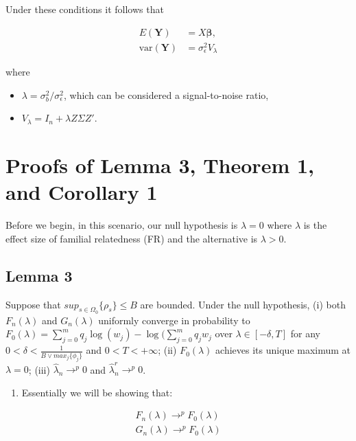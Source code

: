 \documentclass[
]{article}
\providecommand{\tightlist}{%
  \setlength{\itemsep}{0pt}\setlength{\parskip}{0pt}}
\begin{document}
Under these conditions it follows that

\[
\begin{aligned}
E(\mathbf{Y}) &= X\mathbf{\beta},\\
\text{var}(\mathbf{Y}) &= \sigma_{\epsilon}^2 V_{\lambda}
\end{aligned}
\]

where

\begin{itemize}
\tightlist
\item
  \(\lambda = \sigma_b^2 / \sigma_{\epsilon}^2\), which can be
  considered a signal-to-noise ratio,
\item
  \(V_{\lambda} = I_n + \lambda Z\Sigma Z'\).
\end{itemize}

\section{Proofs of Lemma 3, Theorem 1, and Corollary
1}\label{proofs-of-lemma-3-theorem-1-and-corollary-1}

Before we begin, in this scenario, our null hypothesis is
\(\lambda = 0\) where \(\lambda\) is the effect size of familial
relatedness (FR) and the alternative is \(\lambda > 0\).

\subsection{Lemma 3}\label{lemma-3}

Suppose that \(sup_{s \in \Omega_0}\{\rho_s\} \le B\) are bounded. Under
the null hypothesis, (i) both \(F_n(\lambda)\) and \(G_n(\lambda)\)
uniformly converge in probability to
\(F_0(\lambda) = \sum_{j=0}^m q_j \log(w_j) - \log(\sum_{j=0}^m q_j w_j\)
over \(\lambda \in [-\delta, T]\) for any
\(0 < \delta < \frac{1}{B \vee max_j\{ \phi_j\}}\) and
\(0 < T < +\infty\); (ii) \(F_0(\lambda)\) achieves its unique maximum
at \(\lambda = 0\); (iii) \(\hat \lambda_n \rightarrow^p 0\) and
\(\hat \lambda^r_n \rightarrow^p 0\).

\begin{enumerate}
\def\labelenumi{\roman{enumi})}
\tightlist
\item
  Essentially we will be showing that:
\end{enumerate}

\[
\begin{split}
F_n(\lambda) \rightarrow^p F_0(\lambda) \\
G_n(\lambda) \rightarrow^p F_0(\lambda)
\end{split}
\]
\end{document}
